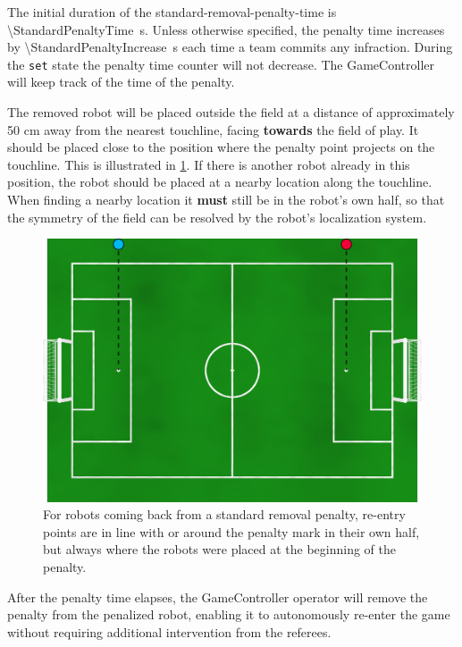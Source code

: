 The initial duration of the standard-removal-penalty-time is \qty{\StandardPenaltyTime}{\second}. Unless otherwise specified, the penalty time increases by \qty{\StandardPenaltyIncrease}{\second} each time a team commits any infraction. During the \texttt{set} state the penalty time counter will not decrease. The GameController will keep track of the time of the penalty.

The removed robot will be placed outside the field at a distance of approximately 50 cm away from the nearest touchline, facing \textbf{towards} the field of play. It should be placed close to the position where the penalty point projects on the touchline. This is illustrated in \cref{fig:penalty_re-entry_points}. If there is another robot already in this position, the robot should be placed at a nearby location along the touchline.
When finding a nearby location it \textbf{must} still be in the robot's own half, so that the symmetry of the field can be resolved by the robot's localization system.

\begin{figure}[t]
    \centerline{\includegraphics[width=\columnwidth]{figs/penalty_re-entry_points_2024.png}}
    \caption{For robots coming back from a standard removal penalty, re-entry points are in line with or around the penalty mark in their own half, but always where the robots were placed at the beginning of the penalty.}
    \label{fig:penalty_re-entry_points}
\end{figure}

After the penalty time elapses, the GameController operator will remove the penalty from the penalized robot, enabling it to autonomously re-enter the game without requiring additional intervention from the referees.


